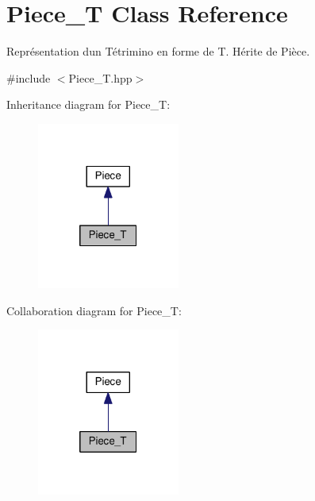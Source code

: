 \hypertarget{classPiece__T}{}\section{Piece\+\_\+T Class Reference}
\label{classPiece__T}


Représentation d\textquotesingle{}un Tétrimino en forme de T. Hérite de Pièce.  




{\ttfamily \#include $<$Piece\+\_\+\+T.\+hpp$>$}



Inheritance diagram for Piece\+\_\+T\+:
\nopagebreak
\begin{figure}[H]
\begin{center}
\leavevmode
\includegraphics[width=133pt]{classPiece__T__inherit__graph}
\end{center}
\end{figure}


Collaboration diagram for Piece\+\_\+T\+:
\nopagebreak
\begin{figure}[H]
\begin{center}
\leavevmode
\includegraphics[width=133pt]{classPiece__T__coll__graph}
\end{center}
\end{figure}
